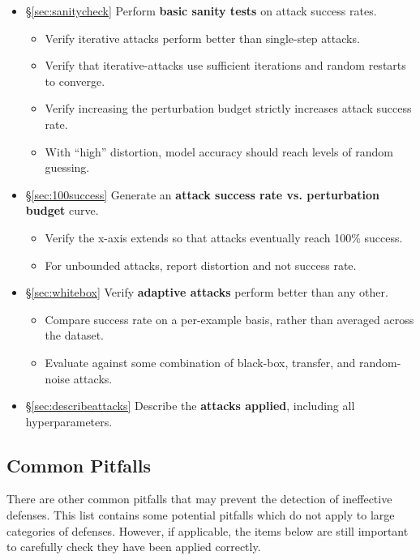 \documentclass{article} %
\begin{document}
\begin{itemize}[leftmargin=*]
\begin{itemize}[leftmargin=*]
  \end{itemize}
\item \S\ref{sec:sanitycheck} Perform \textbf{basic sanity tests} on attack success rates.
  \begin{itemize}[leftmargin=*]
    \item Verify iterative attacks perform better than single-step attacks.
    \item Verify that iterative-attacks use sufficient iterations and random restarts to converge. 
    \item Verify increasing the perturbation budget strictly increases attack success rate.
    \item With ``high'' distortion, model accuracy should reach levels of random guessing.%
  \end{itemize}
\item \S\ref{sec:100success} Generate an \textbf{attack success rate vs. perturbation budget} curve.
  \begin{itemize}[leftmargin=*]
  \item Verify the x-axis extends so that attacks eventually reach 100\% success.
  \item For unbounded attacks, report distortion and not success rate.
  \end{itemize}
\item \S\ref{sec:whitebox} Verify \textbf{adaptive attacks} perform better than any other.
  \begin{itemize}[leftmargin=*]
  \item Compare success rate on a per-example basis, rather than averaged across the dataset.
  \item Evaluate against some combination of black-box, transfer, and random-noise attacks.
  \end{itemize}
\item \S\ref{sec:describeattacks} Describe the \textbf{attacks applied}, including all hyperparameters.

\end{itemize}

\subsection{Common Pitfalls}
There are other common pitfalls that may prevent the detection of ineffective defenses.
%
This list contains some potential pitfalls which do not apply to
large categories of defenses.
%
However, if applicable, the items below are still important to carefully
check they have been applied correctly.
%
\end{document}
